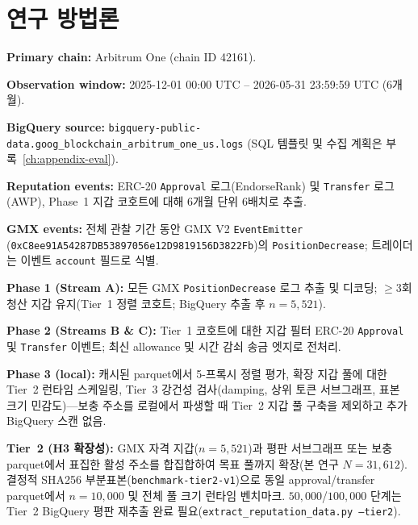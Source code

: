 ﻿%
\chapter{연구 방법론}
\label{ch:methodology}


\textbf{Primary chain:} Arbitrum One (chain ID 42161).

\textbf{Observation window:} 2025-12-01 00:00 UTC -- 2026-05-31 23:59:59 UTC (6개월).

\textbf{BigQuery source:} \texttt{bigquery-public-data.goog\_blockchain\_arbitrum\_one\_us.logs} (SQL 템플릿 및 수집 계획은 부록~\ref{ch:appendix-eval}).

\textbf{Reputation events:} ERC-20 \texttt{Approval} 로그(EndorseRank) 및 \texttt{Transfer} 로그(AWP), Phase~1 지갑 코호트에 대해 6개월 단위 6배치로 추출.

\textbf{GMX events:} 전체 관찰 기간 동안 GMX V2 \texttt{EventEmitter} (\texttt{0xC8ee91A54287DB53897056e12D9819156D3822Fb})의 \texttt{PositionDecrease}; 트레이더는 이벤트 \texttt{account} 필드로 식별.


\textbf{Phase 1 (Stream A):} 모든 GMX \texttt{PositionDecrease} 로그 추출 및 디코딩; $\geq 3$회 청산 지갑 유지(Tier~1 정렬 코호트; BigQuery 추출 후 $n=5{,}521$).

\textbf{Phase 2 (Streams B \& C):} Tier~1 코호트에 대한 지갑 필터 ERC-20 \texttt{Approval} 및 \texttt{Transfer} 이벤트; 최신 allowance 및 시간 감쇠 송금 엣지로 전처리.

\textbf{Phase 3 (local):} 캐시된 parquet에서 5-프록시 정렬 평가, 확장 지갑 풀에 대한 Tier~2 런타임 스케일링, Tier~3 강건성 검사(damping, 상위 토큰 서브그래프, 표본 크기 민감도)---보충 주소를 로컬에서 파생할 때 Tier~2 지갑 풀 구축을 제외하고 추가 BigQuery 스캔 없음.


\textbf{Tier~2 (H3 확장성):} GMX 자격 지갑($n=5{,}521$)과 평판 서브그래프 또는 보충 parquet에서 표집한 활성 주소를 합집합하여 목표 풀까지 확장(본 연구 $N=31{,}612$). 결정적 SHA256 부분표본(\texttt{benchmark-tier2-v1})으로 동일 approval/transfer parquet에서 $n=10{,}000$ 및 전체 풀 크기 런타임 벤치마크. $50{,}000$/$100{,}000$ 단계는 Tier~2 BigQuery 평판 재추출 완료 필요(\texttt{extract\_reputation\_data.py --tier2}).

